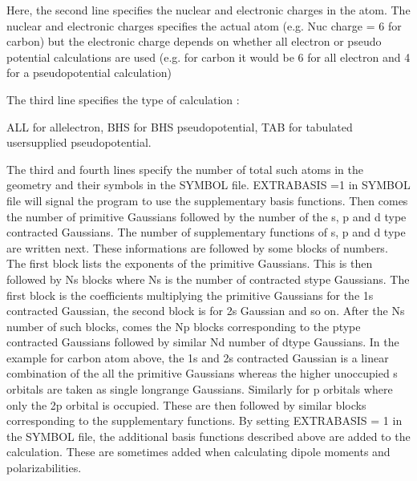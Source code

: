 \documentclass[letterpaper,10pt,english,openany,oneside]{sphinxmanual}
\begin{document}
\sphinxAtStartPar
Here, the second line specifies the nuclear and electronic charges in the atom. The nuclear and electronic charges specifies the actual atom (e.g. Nuc charge = 6 for carbon) but the electronic charge depends on whether all electron or pseudo potential calculations are used (e.g. for carbon it would be 6 for all electron and 4 for a pseudopotential calculation)

\sphinxAtStartPar
The third line specifies the type of calculation :

\sphinxAtStartPar
ALL for all\sphinxhyphen{}electron, BHS for BHS pseudopotential, TAB for tabulated user\sphinxhyphen{}supplied pseudopotential.

\sphinxAtStartPar
The third and fourth lines specify the number of total such atoms in the geometry
and their symbols in the SYMBOL file. EXTRABASIS =1 in SYMBOL file will signal
the program to use the supplementary basis functions. Then comes the number of
primitive Gaussians followed by the number of the s, p and d \sphinxhyphen{}type contracted
Gaussians. The number of supplementary functions of s, p and d type are written next.
These informations are followed by some blocks of numbers. The first block lists the
exponents of the primitive Gaussians. This is then followed by Ns blocks where Ns
is the number of contracted s\sphinxhyphen{}type Gaussians. The first block is the coefficients
multiplying the primitive Gaussians for the 1s contracted Gaussian, the second block
is for 2s Gaussian and so on. After the Ns number of such blocks, comes the Np blocks
corresponding to the p\sphinxhyphen{}type contracted Gaussians followed by similar Nd number of d\sphinxhyphen{}type Gaussians. In the example for carbon atom above, the 1s and 2s contracted Gaussian is a linear combination of the all the primitive Gaussians whereas the higher unoccupied s orbitals are taken as single long\sphinxhyphen{}range Gaussians. Similarly for p orbitals where only the 2p orbital is occupied. These are then followed by similar blocks corresponding to the supplementary functions.
By setting EXTRABASIS = 1 in the SYMBOL file, the additional basis functions described above are added to the calculation.  These are sometimes added when calculating dipole moments and polarizabilities.

\sphinxstepscope
\end{document}

